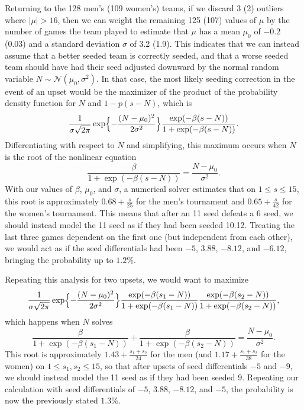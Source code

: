 \documentclass{article}
\begin{document}
Returning to the 128 men's (109 women's) teams, if we discard 3 (2) outliers where $\lvert\mu\rvert>16$, then we can weight the remaining 125 (107) values of $\mu$ by the number of games the team played to estimate that $\mu$ has a mean $\mu_0$  of $-0.2$ (0.03) and a standard deviation $\sigma$  of 3.2 (1.9). This indicates that we can instead assume that a better seeded team is correctly seeded, and that a worse seeded team should have had their seed adjusted downward by the normal random variable $N\sim\mathcal{N}(\mu_0,\sigma^2)$.  In that case, the most likely seeding correction in the event of an upset would be the maximizer of the product of the probability density function for $N$ and $1-p(s-N)$, which is
\[\frac1{\sigma\sqrt{2\pi}}\exp\Bigl\{-\frac{(N-\mu_0)^2}{2\sigma^2}\Bigr\}\frac{\exp(-\beta(s-N))}{1+\exp(-\beta(s-N))}.\]
Differentiating with respect to $N$ and simplifying, this maximum occurs when $N$ is the root of the nonlinear equation
\[\frac\beta{1+\exp(-\beta(s-N))}=\frac{N-\mu_0}{\sigma^2}.\]
With our values of $\beta$, $\mu_0$, and $\sigma$, a numerical solver estimates that on $1\le s\le15$, this root is approximately $0.68+\frac s{25}$ for the men's tournament and $0.65+\frac s{42}$ for the women's tournament.  This means that after an 11 seed defeats a 6 seed, we should instead model the 11 seed as if they had been seeded 10.12.  Treating the last three games dependent on the first one (but independent from each other), we would act as if the seed differentials had been $-5$, $3.88$, $-8.12$, and $-6.12$, bringing the probability up to $1.2\%$.

Repeating this analysis for two upsets, we would want to maximize
\[
\frac1{\sigma\sqrt{2\pi}}\exp\Bigl\{-\frac{(N-\mu_0)^2}{2\sigma^2}\Bigr\}
\frac{\exp(-\beta(s_1-N))}{1+\exp(-\beta(s_1-N))}
\frac{\exp(-\beta(s_2-N))}{1+\exp(-\beta(s_2-N))},
\]
which happens when $N$ solves
\[\frac\beta{1+\exp(-\beta(s_1-N))}+\frac\beta{1+\exp(-\beta(s_2-N))}=\frac{N-\mu_0}{\sigma^2}.\]
This root is approximately $1.43+\frac{s_1+s_2}{24}$ for the men (and $1.17+\frac{s_1+s_2}{38}$ for the women) on $1\le s_1,s_2\le15$, so that after upsets of seed differentials $-5$ and $-9$, we should instead model the 11 seed as if they had been seeded 9.  Repeating our calculation with seed differentials of $-5$, $3.88$, $-8.12$, and $-5$, the probability is now the previously stated $1.3\%$.
\end{document}
